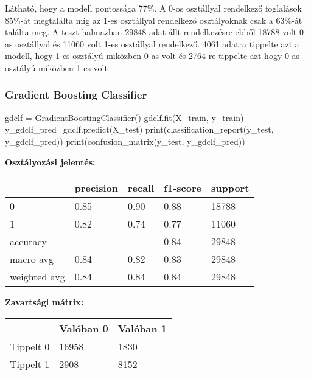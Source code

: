 \bigskip

Látható, hogy a modell pontossága 77\%. A 0-os osztállyal rendelkező foglalások 85\%-át megtalálta míg az 1-es osztállyal rendelkező osztályoknak csak a 63\%-át találta meg. A teszt halmazban 29848 adat állt rendelkezésre ebből 18788 volt 0-as osztállyal és 11060 volt 1-es osztállyal rendelkező. 4061 adatra tippelte azt a modell, hogy 1-es osztályú miközben 0-as volt és 2764-re tippelte azt hogy 0-as osztályú miközben 1-es volt

\subsubsection{Gradient Boosting Classifier}

\begin{python}
gdclf = GradientBoostingClassifier()
gdclf.fit(X_train, y_train)
y_gdclf_pred=gdclf.predict(X_test)
print(classification_report(y_test, y_gdclf_pred))
print(confusion_matrix(y_test, y_gdclf_pred))
\end{python}

\medskip

\noindent \textbf{Osztályozási jelentés:}

\medskip

\begin{tabular}{|l|l|l|l|l|}
\hline
             & precision & recall & f1-score & support \\
             \hline
0            & 0.85      & 0.90   & 0.88     & 18788   \\
\hline
1            & 0.82      & 0.74   & 0.77     & 11060   \\
\hline
accuracy     &           &        & 0.84     & 29848   \\
\hline
macro avg    & 0.84      & 0.82   & 0.83     & 29848   \\
\hline
weighted avg & 0.84      & 0.84   & 0.84     & 29848  \\
\hline
\end{tabular}

\medskip

\noindent \textbf{Zavartsági mátrix:}

\medskip

\begin{tabular}{|l|l|l|}
\hline
          & Valóban 0 & Valóban 1 \\
          \hline
Tippelt 0 & 16958     & 1830     \\
\hline
Tippelt 1 & 2908      & 8152    \\
\hline
\end{tabular}

